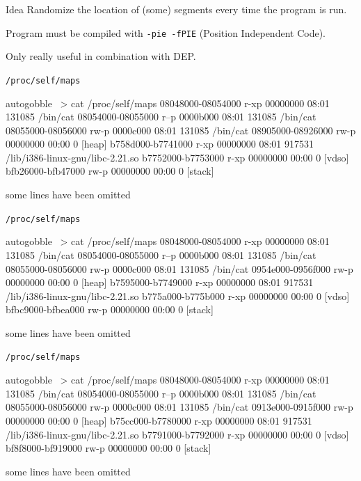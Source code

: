 \documentclass[beamer]{uibk}
\begin{document}
\begin{frame}{Idea}
    Randomize the location of (some) segments every time the program is run.
    \medskip

    Program must be compiled with \texttt{-pie -fPIE} (Position Independent
    Code).
    \medskip

    Only really useful in combination with DEP.
\end{frame}

\begin{frame}[fragile]{\texttt{/proc/self/maps}}
    \begin{pre*}{autogobble}
        ~> cat /proc/self/maps
        08048000-08054000 r-xp 00000000 08:01 131085     /bin/cat
        08054000-08055000 r--p 0000b000 08:01 131085     /bin/cat
        08055000-08056000 rw-p 0000c000 08:01 131085     /bin/cat
        08905000-08926000 rw-p 00000000 00:00 0          [heap]
        b758d000-b7741000 r-xp 00000000 08:01 917531     /lib/i386-linux-gnu/libc-2.21.so
        b7752000-b7753000 r-xp 00000000 00:00 0          [vdso]
        bfb26000-bfb47000 rw-p 00000000 00:00 0          [stack]
    \end{pre*}
    \bigskip
    some lines have been omitted
\end{frame}
\begin{frame}[fragile]{\texttt{/proc/self/maps}}
    \begin{pre*}{autogobble}
        ~> cat /proc/self/maps
        08048000-08054000 r-xp 00000000 08:01 131085     /bin/cat
        08054000-08055000 r--p 0000b000 08:01 131085     /bin/cat
        08055000-08056000 rw-p 0000c000 08:01 131085     /bin/cat
        0954e000-0956f000 rw-p 00000000 00:00 0          [heap]
        b7595000-b7749000 r-xp 00000000 08:01 917531     /lib/i386-linux-gnu/libc-2.21.so
        b775a000-b775b000 r-xp 00000000 00:00 0          [vdso]
        bfbc9000-bfbea000 rw-p 00000000 00:00 0          [stack]
    \end{pre*}
    \bigskip
    some lines have been omitted
\end{frame}
\begin{frame}[fragile]{\texttt{/proc/self/maps}}
    \begin{pre*}{autogobble}
        ~> cat /proc/self/maps
        08048000-08054000 r-xp 00000000 08:01 131085     /bin/cat
        08054000-08055000 r--p 0000b000 08:01 131085     /bin/cat
        08055000-08056000 rw-p 0000c000 08:01 131085     /bin/cat
        0913e000-0915f000 rw-p 00000000 00:00 0          [heap]
        b75cc000-b7780000 r-xp 00000000 08:01 917531     /lib/i386-linux-gnu/libc-2.21.so
        b7791000-b7792000 r-xp 00000000 00:00 0          [vdso]
        bf8f8000-bf919000 rw-p 00000000 00:00 0          [stack]
    \end{pre*}
    \bigskip
    some lines have been omitted
\end{frame}
\end{document}
